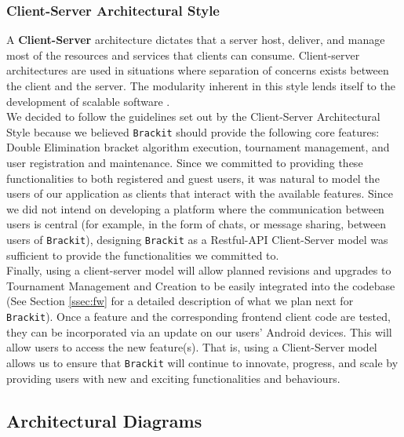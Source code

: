 \documentclass{article}
\begin{document}
\subsubsection{Client-Server Architectural Style}
A \textbf{Client-Server} architecture dictates that a server host, deliver, and manage most of the resources and services that clients can consume. Client-server architectures are used in situations where separation of concerns exists between the client and the server. The modularity inherent in this style lends itself to the development of scalable software \cite{sa_waterloo}. \\
We decided to follow the guidelines set out by the Client-Server Architectural Style because we believed \texttt{Brackit} should provide the following core features: Double Elimination bracket algorithm execution, tournament management, and user registration and maintenance. Since we committed to providing these functionalities to both registered and guest users, it was natural to model the users of our application as clients that interact with the available features.
Since we did not intend on developing a platform where the communication between users is central (for example, in the form of chats, or message sharing, between users of \texttt{Brackit}), designing \texttt{Brackit} as a Restful-API \cite{WinNT} Client-Server model was sufficient to provide the functionalities we committed to. \\
Finally, using a client-server model will allow planned revisions and upgrades to Tournament Management and Creation to be easily integrated into the codebase (See Section \ref{ssec:fw} for a detailed description of what we plan next for \texttt{Brackit}). Once a feature and the corresponding frontend client code are tested, they can be incorporated via an update on our users' Android devices. This will allow users to access the new feature(s). That is, using a Client-Server model allows us to ensure that \texttt{Brackit} will continue to innovate, progress, and scale by providing users with new and exciting functionalities and behaviours.
\clearpage
\subsection{Architectural Diagrams}
\end{document}
